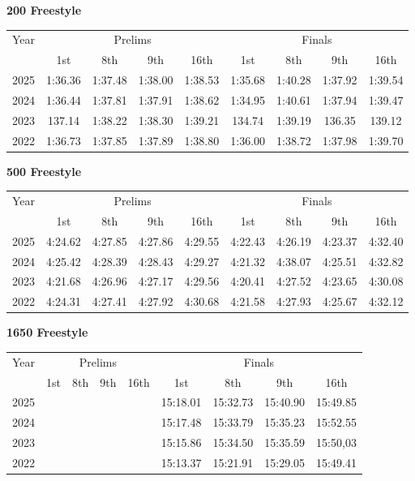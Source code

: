\textbf{200 Freestyle}

\begin{flushleft}
\begin{tabular}{|c|c|c|c|c|c|c|c|c|}
\hline
Year & \multicolumn{4}{c|}{Prelims} & \multicolumn{4}{c|}{Finals} \\
\cline{2-9}
& 1st & 8th & 9th & 16th & 1st & 8th & 9th & 16th \\
\hline
2025 & 1:36.36 & 1:37.48 & 1:38.00 & 1:38.53 & 1:35.68 & 1:40.28 & 1:37.92 & 1:39.54 \\
2024 & 1:36.44 & 1:37.81 & 1:37.91 & 1:38.62 & 1:34.95 & 1:40.61 & 1:37.94 & 1:39.47 \\
2023 & 137.14 & 1:38.22 & 1:38.30 & 1:39.21 & 134.74 & 1:39.19 & 136.35 & 139.12 \\
2022 & 1:36.73 & 1:37.85 & 1:37.89 & 1:38.80 & 1:36.00 & 1:38.72 & 1:37.98 & 1:39.70 \\
\hline
\end{tabular}
\end{flushleft}

\textbf{500 Freestyle}

\begin{flushleft}
\begin{tabular}{|c|c|c|c|c|c|c|c|c|}
\hline
Year & \multicolumn{4}{c|}{Prelims} & \multicolumn{4}{c|}{Finals} \\
\cline{2-9}
& 1st & 8th & 9th & 16th & 1st & 8th & 9th & 16th \\
\hline
2025 & 4:24.62 & 4:27.85 & 4:27.86 & 4:29.55 & 4:22.43 & 4:26.19 & 4:23.37 & 4:32.40 \\
2024 & 4:25.42 & 4:28.39 & 4:28.43 & 4:29.27 & 4:21.32 & 4:38.07 & 4:25.51 & 4:32.82 \\
2023 & 4:21.68 & 4:26.96 & 4:27.17 & 4:29.56 & 4:20.41 & 4:27.52 & 4:23.65 & 4:30.08 \\
2022 & 4:24.31 & 4:27.41 & 4:27.92 & 4:30.68 & 4:21.58 & 4:27.93 & 4:25.67 & 4:32.12 \\
\hline
\end{tabular}
\end{flushleft}

\textbf{1650 Freestyle}

\begin{flushleft}
\begin{tabular}{|c|c|c|c|c|c|c|c|c|}
\hline
Year & \multicolumn{4}{c|}{Prelims} & \multicolumn{4}{c|}{Finals} \\
\cline{2-9}
& 1st & 8th & 9th & 16th & 1st & 8th & 9th & 16th \\
\hline
2025 &  &  &  &  & 15:18.01 & 15:32.73 & 15:40.90 & 15:49.85 \\
2024 &  &  &  &  & 15:17.48 & 15:33.79 & 15:35.23 & 15:52.55 \\
2023 &  &  &  &  & 15:15.86 & 15:34.50 & 15:35.59 & 15:50,03 \\
2022 &  &  &  &  & 15:13.37 & 15:21.91 & 15:29.05 & 15:49.41 \\
\hline
\end{tabular}
\end{flushleft}

